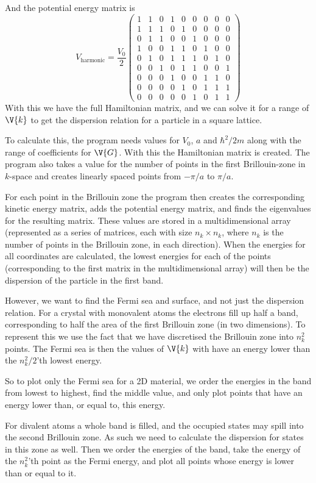 \documentclass[main.tex]{subfiles}
\begin{document}
	And the potential energy matrix is
	\begin{equation}
		V_{\text{harmonic}} = \frac{V_0}{2} \begin{pmatrix}
		1 & 1 & 0 & 1 & 0 & 0 & 0 & 0 & 0 \\
		1 & 1 & 1 & 0 & 1 & 0 & 0 & 0 & 0 \\
		0 & 1 & 1 & 0 & 0 & 1 & 0 & 0 & 0 \\
		1 & 0 & 0 & 1 & 1 & 0 & 1 & 0 & 0 \\
		0 & 1 & 0 & 1 & 1 & 1 & 0 & 1 & 0 \\
		0 & 0 & 1 & 0 & 1 & 1 & 0 & 0 & 1 \\
		0 & 0 & 0 & 1 & 0 & 0 & 1 & 1 & 0 \\
		0 & 0 & 0 & 0 & 1 & 0 & 1 & 1 & 1 \\
		0 & 0 & 0 & 0 & 0 & 1 & 0 & 1 & 1
		\end{pmatrix}
	\end{equation}
	With this we have the full Hamiltonian matrix, and we can solve it for a range of $ \V{k} $ to get the dispersion relation for a particle in a square lattice.
	
	To calculate this, the program needs values for $ V_0 $, $ a $ and $ \hbar^2/2m $ along with the range of coefficients for $ \V{G} $. With this the Hamiltonian matrix is created. The program also takes a value for the number of points in the first Brillouin-zone in $ k $-space and creates linearly spaced points from $ -\pi/a $ to $ \pi/a $.
	
	For each point in the Brillouin zone the program then creates the corresponding kinetic energy matrix, adds the potential energy matrix, and finds the eigenvalues for the resulting matrix. These values are stored in a multidimensional array (represented as a series of matrices, each with size $ n_k \times n_k $, where $ n_k $ is the number of points in the Brillouin zone, in each direction). When the energies for all coordinates are calculated, the lowest energies for each of the points (corresponding to the first matrix in the multidimensional array) will then be the dispersion of the particle in the first band.
	
	However, we want to find the Fermi sea and surface, and not just the dispersion relation. For a crystal with monovalent atoms the electrons fill up half a band, corresponding to half the area of the first Brillouin zone (in two dimensions). To represent this we use the fact that we have discretised the Brillouin zone into $ n_k^2 $ points. The Fermi sea is then the values of $ \V{k} $ with have an energy lower than the $ n_k^2/2 $'th lowest energy.
	
	So to plot only the Fermi sea for a 2D material, we order the energies in the band from lowest to highest, find the middle value, and only plot points that have an energy lower than, or equal to, this energy.
	
	For divalent atoms a whole band is filled, and the occupied states may spill into the second Brillouin zone. As such we need to calculate the dispersion for states in this zone as well. Then we order the energies of the band, take the energy of the $ n_k^2 $'th point as the Fermi energy, and plot all points whose energy is lower than or equal to it.
	
	
\end{document}
